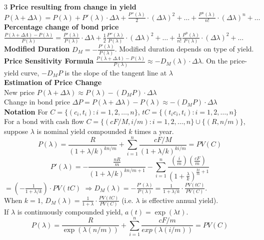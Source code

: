 \documentclass{article}
\begin{document}
{\begin{multicols*}{3}
\textbf{Price resulting from change in yield}\\
$P(\lambda+\Delta\lambda)=P(\lambda)+P'(\lambda)\cdot\Delta\lambda+\frac{P''(\lambda)}{2}\cdot(\Delta\lambda)^2+\dots+\frac{P^n(\lambda)}{n!}\cdot(\Delta\lambda)^n+\dots$\\
\textbf{Percentage change of bond price}\\
$\frac{P(\lambda + \Delta\Lambda)-P(\lambda)}{P(\lambda)}=\frac{P'(\lambda)}{P(\lambda)}\cdot \Delta\lambda+\frac{1}{2}\frac{P''(\lambda)}{P(\lambda)}\cdot(\Delta\lambda)^2+\dots+\frac{1}{n!}\frac{P^n(\lambda)}{P(\lambda)}\cdot(\Delta\lambda)^2+\dots$\\
\textbf{Modified Duration} $D_M=-\frac{P'(\lambda)}{P(\lambda)}$. Modified duration depends on type of yield.\\
\textbf{Price Sensitivity Formula} $\frac{P(\lambda + \Delta\Lambda)-P(\lambda)}{P(\lambda)}\approx-D_M(\lambda)\cdot\Delta\lambda$. On the price-yield curve, $-D_MP$ is the slope of the tangent line at $\lambda$\\
\textbf{Estimation of Price Change}\\
New price $P(\lambda + \Delta\lambda)\approx P(\lambda)-(D_MP)\cdot\Delta\lambda$\\
Change in bond price $\Delta P=P(\lambda+\Delta\lambda)-P(\lambda)\approx-(D_MP)\cdot\Delta\lambda$\\
\textbf{Notation} For $C=\{(c_i,t_i):i=1,2,\dots,n\}$, $tC=\{(t_ic_i,t_i):i=1,2,\dots,n\}$\\
For a bond with cash flow $C=\{(cF/M,i/m):i=1,2,\dots,n\}\cup\{(R,n/m)\}$, suppose $\lambda$ is nominal yield compounded $k$ times a year.\\
\vspace{-10pt} 
$$P(\lambda)=\frac{R}{(1+\lambda/k)^{kn/m}}+\sum_{i=1}^n\frac{cF/M}{(1+\lambda/k)^{ki/m}}=PV(C)$$
$$
P'(\lambda)=-\frac{\frac{nR}{m}}{(1+\lambda/k)^{kn/m+1}}-\sum_{i=1}^n\frac{(\frac{i}{m})(\frac{cF}{m})}{(1+\frac{\lambda}{k})^{\frac{ki}{m}+1}}$$
$=\left(-\frac{1}{1+\lambda /k}\right)\cdot PV(tC)$
$\Rightarrow D_M(\lambda)=-\frac{P'(\lambda)}{P(\lambda)}=\frac{1}{1+\lambda/k}\cdot\frac{PV(tC)}{PV(C)}$. \\
When $k=1$, $D_M(\lambda)=\frac{1}{1+\lambda}\cdot\frac{PV(tC)}{PV(C)}$ (i.e. $\lambda$ is effective annual yield). \\
If $\lambda$ is continuously compounded yield, $a(t)=\exp(\lambda t)$.
\vspace{-5pt}
$$P(\lambda)=\frac{R}{\exp(\lambda(n/m))}+\sum_{i=1}^n\frac{cF/m}{exp(\lambda(i/m))}=PV(C)$$

\end{multicols*}}
\end{document}
